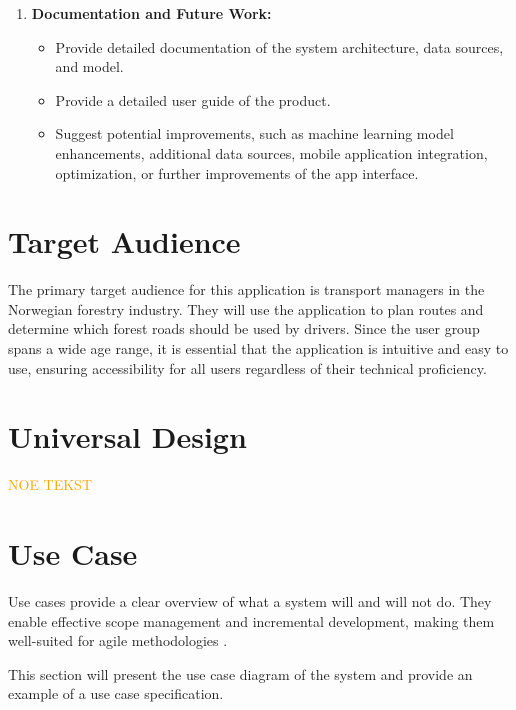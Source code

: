 \begin{enumerate}
    \item \textbf{Documentation and Future Work:}
    \begin{itemize}
        \item Provide detailed documentation of the system architecture, data sources, and model.
        \item Provide a detailed user guide of the product.
        \item Suggest potential improvements, such as machine learning model enhancements, additional data sources, mobile application integration, optimization, or further improvements of the app interface.
    \end{itemize}
\end{enumerate}

\section{Target Audience}

The primary target audience for this application is transport managers in the Norwegian forestry industry. They will use the application to plan routes and determine which forest roads should be used by drivers. Since the user group spans a wide age range, it is essential that the application is intuitive and easy to use, ensuring accessibility for all users regardless of their technical proficiency.

\section{Universal Design}

\textcolor{orange}{NOE TEKST}

\section{Use Case}

Use cases provide a clear overview of what a system will and will not do. They enable effective scope management and incremental development, making them well-suited for agile methodologies \cite{jacobson_use_case}. 

This section will present the use case diagram of the system and provide an example of a use case specification.

